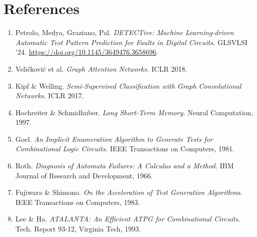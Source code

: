\documentclass[11pt,a4paper]{article}
\begin{document}
\section*{References}

\begin{enumerate}[leftmargin=*,itemsep=2pt]
  \item Petrolo, Medya, Graziano, Pal.
        \emph{DETECTive: Machine Learning-driven Automatic Test Pattern
        Prediction for Faults in Digital Circuits.} GLSVLSI '24.
        \url{https://doi.org/10.1145/3649476.3658696}.
  \item Veli\v{c}kovi\'{c} et al.
        \emph{Graph Attention Networks.} ICLR 2018.
  \item Kipf \& Welling.
        \emph{Semi-Supervised Classification with Graph Convolutional
        Networks.} ICLR 2017.
  \item Hochreiter \& Schmidhuber.
        \emph{Long Short-Term Memory.} Neural Computation, 1997.
  \item Goel.
        \emph{An Implicit Enumeration Algorithm to Generate Tests for
        Combinational Logic Circuits.} IEEE Transactions on Computers,
        1981.
  \item Roth.
        \emph{Diagnosis of Automata Failures: A Calculus and a Method.}
        IBM Journal of Research and Development, 1966.
  \item Fujiwara \& Shimono.
        \emph{On the Acceleration of Test Generation Algorithms.} IEEE
        Transactions on Computers, 1983.
  \item Lee \& Ha.
        \emph{ATALANTA: An Efficient ATPG for Combinational Circuits.}
        Tech. Report 93-12, Virginia Tech, 1993.
\end{enumerate}
\end{document}
